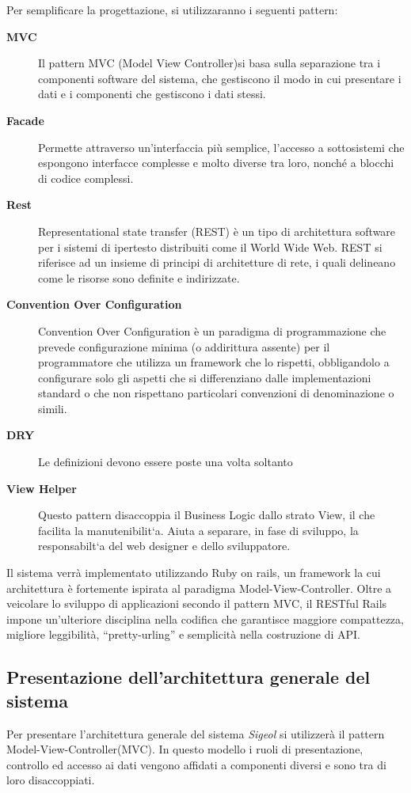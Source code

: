 \documentclass[11pt,a4paper]{article}
\begin{document}
Per semplificare la progettazione, si utilizzaranno i seguenti pattern:
\begin{description}
 \item[\textbf{MVC}] 
Il pattern MVC (Model View Controller)si basa sulla separazione tra i componenti software del sistema, che gestiscono il modo in cui presentare i dati e i componenti che gestiscono i dati stessi. 
 \item[\textbf{Facade}]
Permette attraverso un'interfaccia più semplice, l'accesso a sottosistemi che espongono interfacce complesse e molto diverse tra loro, nonché a blocchi di codice complessi.
\item[\textbf{Rest}]
Representational state transfer (REST) è un tipo di architettura software per i sistemi di ipertesto distribuiti come il World Wide Web. 
REST si riferisce ad un insieme di principi di architetture di rete, i quali delineano come le risorse sono definite e indirizzate.


\item[\textbf{Convention Over Configuration}]
Convention Over Configuration è un paradigma di programmazione che prevede configurazione minima (o addirittura assente) per il programmatore che utilizza un framework che lo rispetti, obbligandolo a configurare solo gli aspetti che si differenziano dalle implementazioni standard o che non rispettano particolari convenzioni di denominazione o simili.
\item[\textbf{DRY}]
Le definizioni devono essere poste una volta soltanto
\item[\textbf{View Helper}]
Questo pattern disaccoppia il Business Logic dallo strato View, il che facilita
la manutenibilit`a. Aiuta a separare, in fase di sviluppo, la responsabilt`a
del web designer e dello sviluppatore.
\end{description}


Il sistema verrà implementato utilizzando Ruby on rails, un framework la cui architettura è fortemente ispirata al paradigma Model-View-Controller. 
Oltre a veicolare lo sviluppo di applicazioni secondo il pattern MVC, il RESTful Rails impone un’ulteriore disciplina nella codifica che garantisce maggiore compattezza, migliore leggibilità, “pretty-urling” e semplicità nella costruzione di API.

\subsection{Presentazione dell'architettura generale del sistema}
Per presentare l'architettura generale del sistema \textit{Sigeol} si utilizzerà il pattern Model-View-Controller(MVC).
In questo modello i ruoli di presentazione, controllo ed accesso ai dati vengono affidati a componenti diversi e sono tra di loro disaccoppiati.
\end{document}

